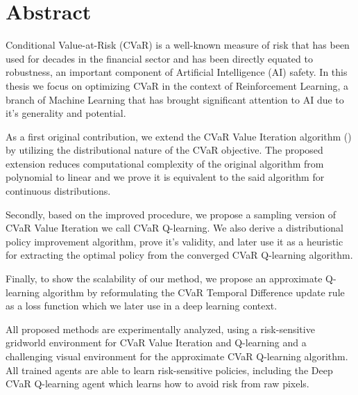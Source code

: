 \begingroup
\let\clearpage\relax
\let\cleardoublepage\relax
\let\cleardoublepage\relax

\chapter*{Abstract}


Conditional Value-at-Risk (CVaR) is a well-known measure of risk that has been used for decades in the financial sector and has been directly equated to robustness, an important component of Artificial Intelligence (AI) safety. In this thesis we focus on optimizing CVaR in the context of Reinforcement Learning, a branch of Machine Learning that has brought significant attention to AI due to it's generality and potential.

As a first original contribution, we extend the CVaR Value Iteration algorithm (\citet{chow2015risk}) by utilizing the distributional nature of the CVaR objective. The proposed extension reduces computational complexity of the original algorithm from polynomial to linear and we prove it is equivalent to the said algorithm for continuous distributions.

Secondly, based on the improved procedure, we propose a sampling version of CVaR Value Iteration we call CVaR Q-learning. We also derive a distributional policy improvement algorithm, prove it's validity, and later use it as a heuristic for extracting the optimal policy from the converged CVaR Q-learning algorithm.

Finally, to show the scalability of our method, we propose an approximate Q-learning algorithm by reformulating the CVaR Temporal Difference update rule as a loss function which we later use in a deep learning context.

All proposed methods are experimentally analyzed, using a risk-sensitive gridworld environment for CVaR Value Iteration and Q-learning and a challenging visual environment for the approximate CVaR Q-learning algorithm. All trained agents are able to learn risk-sensitive policies, including the  Deep CVaR Q-learning agent which learns how to avoid risk from raw pixels.



%
%

\endgroup

\vfill

